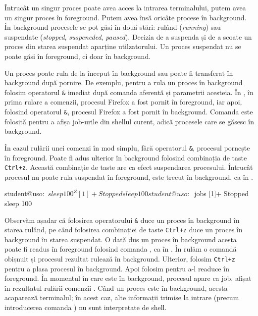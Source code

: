 Întrucât un singur proces poate avea acces la intrarea terminalului, putem avea un singur proces în foreground.
Putem avea însă oricâte procese în background.
În background procesele se pot găsi în două stări: rulând (\textit{running}) sau suspendate (\textit{stopped}, \textit{suspeneded}, \textit{paused}).
Decizia de a suspenda și de a scoate un proces din starea suspendat aparține utilzatorului.
Un proces suspendat nu se poate găsi în foreground, ci doar în background.

Un proces poate rula de la început în background sau poate fi transferat în background după pornire.
De exemplu, pentru a rula un proces în background folosim operatorul \texttt{\&} imediat după comanda aferentă și parametrii acesteia.
În , în prima rulare a comenzii, procesul Firefox a fost pornit în foreground, iar apoi, folosind operatorul \texttt{\&}, procesul Firefox a fost pornit în background.
Comanda  este folosită pentru a afișa job-urile din shellul curent, adică procesele care se găsesc în background.


În cazul rulării unei comenzi în mod simplu, fără operatorul \texttt{\&}, procesul pornește în foreground.
Poate fi adus ulterior în background folosind combinația de taste \texttt{Ctrl+z}.
Această combinație de taste are ca efect suspendarea procesului.
Întrucât procesul nu poate rula suspendat în foreground, este trecut în background, ca în .

\begin{screen}[caption={Suspendarea unui process în background},escapechar=,label={lst:process:background-suspend}]
student@uso:~$ sleep 100
^Z
[1]+  Stopped                 sleep 100
student@uso:~$ jobs
[1]+  Stopped                 sleep 100
\end{screen}

Observăm așadar că folosirea operatorului \texttt{\&} duce un proces în background în starea rulând, pe când folosirea combinației de taste \texttt{Ctrl+z} duce un proces în background în starea suspendat.
O dată dus un proces în background acesta poate fi readus în foreground folosind comanda , ca în .
În  rulăm o comandă obișnuit și procesul rezultat rulează în background.
Ulterior, folosim \texttt{Ctrl+z} pentru a plasa procesul în background.
Apoi folosim  pentru a-l readuce în foreground.
În momentul în care este în background, procesul apare ca job, afișat în rezultatul rulării comenzii .
Când un proces este în background, acesta acaparează terminalul;
în acest caz, alte informații trimise la intrare (precum introducerea comanda ) nu sunt interpretate de shell.

